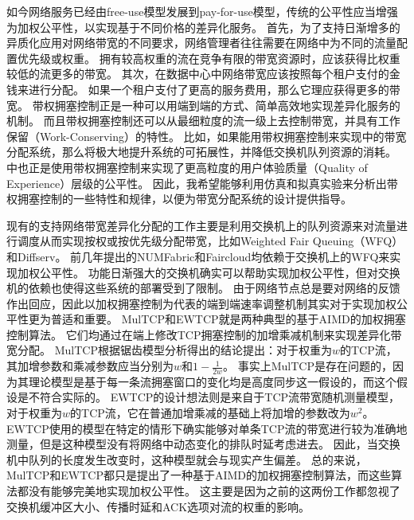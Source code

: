 \documentclass[winfonts]{njuthesis}
\begin{document}
如今网络服务已经由free-use模型发展到pay-for-use模型，传统的公平性应当增强为加权公平性，以实现基于不同价格的差异化服务。
首先，为了支持日渐增多的异质化应用对网络带宽的不同要求，网络管理者往往需要在网络中为不同的流量配置优先级或权重\cite{Hong2013SWAN}。
拥有较高权重的流在竞争有限的带宽资源时，应该获得比权重较低的流更多的带宽。
其次，在数据中心中网络带宽应该按照每个租户支付的金钱来进行分配\cite{popa2012faircloud}。
如果一个租户支付了更高的服务费用，那么它理应获得更多的带宽。
带权拥塞控制正是一种可以用端到端的方式、简单高效地实现差异化服务的机制。
而且带权拥塞控制还可以从最细粒度的流一级上去控制带宽，并具有工作保留（Work-Conserving）的特性。
比如，如果能用带权拥塞控制来实现\cite{popa2012faircloud}中的带宽分配系统，那么将极大地提升系统的可拓展性，并降低交换机队列资源的消耗。
\cite{Nathan2019wcubic}中也正是使用带权拥塞控制来实现了更高粒度的用户体验质量（Quality of Experience）层级的公平性。
因此，我希望能够利用仿真和拟真实验来分析出带权拥塞控制的一些特性和规律，以便为带宽分配系统的设计提供指导。

现有的支持网络带宽差异化分配的工作主要是利用交换机上的队列资源来对流量进行调度从而实现按权或按优先级分配带宽，比如Weighted Fair Queuing（WFQ）\cite{demers1989analysis}\cite{Abhay1993WFQ}和Diffserv\cite{Kathleen1998Diffserv}。
前几年提出的NUMFabric\cite{nagaraj2016numfabric}和Faircloud\cite{popa2012faircloud}均依赖于交换机上的WFQ来实现加权公平性。
功能日渐强大的交换机确实可以帮助实现加权公平性，但对交换机的依赖也使得这些系统的部署受到了限制。
由于网络节点总是要对网络的反馈作出回应，因此以加权拥塞控制为代表的端到端速率调整机制其实对于实现加权公平性更为普适和重要。
MulTCP\cite{crowcroft1998differentiated}和EWTCP\cite{wischik2011design}就是两种典型的基于AIMD的加权拥塞控制算法。
它们均通过在端上修改TCP拥塞控制的加增乘减机制来实现差异化带宽分配。
MulTCP根据锯齿模型分析得出的结论\cite{Floyd1997Sawtooth}提出：对于权重为$w$的TCP流，其加增参数和乘减参数应当分别为$w$和$1-\frac{1}{2w}$。
事实上MulTCP是存在问题的，因为其理论模型是基于每一条流拥塞窗口的变化均是高度同步这一假设的，而这个假设是不符合实际的。
EWTCP的设计想法则是来自于TCP流带宽随机测量模型\cite{padhye1998modeling}，对于权重为$w$的TCP流，它在普通加增乘减的基础上将加增的参数改为$w^2$。
EWTCP使用的模型在特定的情形下确实能够对单条TCP流的带宽进行较为准确地测量，但是这种模型没有将网络中动态变化的排队时延考虑进去。
因此，当交换机中队列的长度发生改变时，这种模型就会与现实产生偏差。
总的来说，MulTCP和EWTCP都只是提出了一种基于AIMD的加权拥塞控制算法，而这些算法都没有能够完美地实现加权公平性。
这主要是因为之前的这两份工作\cite{crowcroft1998differentiated}\cite{wischik2011design}都忽视了交换机缓冲区大小、传播时延和ACK选项对流的权重的影响。
\end{document}

